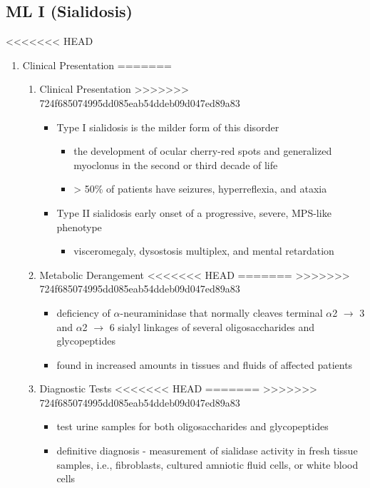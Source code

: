 \documentclass[fontsize=12pt]{scrartcl}
\begin{document}
\begin{enumerate}
\begin{enumerate}
\begin{enumerate}
\begin{enumerate}
\begin{table}[htbp]
\begin{enumerate}
\begin{enumerate}
\begin{enumerate}
\begin{enumerate}
\subsection{ML I (Sialidosis)}
<<<<<<< HEAD
\label{sec:org055a066}
\begin{enumerate}
\item Clinical Presentation
\label{sec:org3a25476}
=======
\label{sec:org1e3e988}
\begin{enumerate}
\item Clinical Presentation
\label{sec:org9717c37}
>>>>>>> 724f685074995dd085eab54ddeb09d047ed89a83
\begin{itemize}
\item Type I sialidosis is the milder form of this disorder
\begin{itemize}
\item the development of ocular cherry-red spots and generalized
myoclonus in the second or third decade of life
\item \textgreater{} 50\% of patients have seizures, hyperreflexia, and ataxia
\end{itemize}

\item Type II sialidosis early onset of a progressive, severe, MPS-like
phenotype
\begin{itemize}
\item visceromegaly, dysostosis multiplex, and mental retardation
\end{itemize}
\end{itemize}

\item Metabolic Derangement
<<<<<<< HEAD
\label{sec:orga1eab91}
=======
\label{sec:org95f0fa9}
>>>>>>> 724f685074995dd085eab54ddeb09d047ed89a83
\begin{itemize}
\item deficiency of \(\alpha\)-neuraminidase that normally cleaves terminal
\(\alpha\)2 \(\to\) 3 and \(\alpha\)2 \(\to\) 6 sialyl linkages of several
oligosaccharides and glycopeptides
\item found in increased amounts in tissues and fluids of affected patients
\end{itemize}

\item Diagnostic Tests
<<<<<<< HEAD
\label{sec:org72bc65b}
=======
\label{sec:org91bde01}
>>>>>>> 724f685074995dd085eab54ddeb09d047ed89a83
\begin{itemize}
\item test urine samples for both oligosaccharides and glycopeptides
\item definitive diagnosis - measurement of sialidase activity in fresh
tissue samples, i.e., fibroblasts, cultured amniotic fluid cells,
or white blood cells
\end{itemize}


\end{enumerate}
\end{enumerate}
\end{enumerate}
\end{enumerate}
\end{enumerate}
\end{enumerate}
\end{table}
\end{enumerate}
\end{enumerate}
\end{enumerate}
\end{enumerate}
\end{document}
